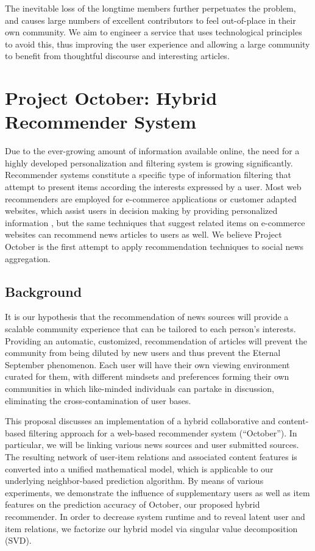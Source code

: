 \documentclass[11pt,letterpaper]{article}
\begin{document}
The inevitable loss of the longtime members further perpetuates the problem, and causes large numbers of excellent contributors to feel out-of-place in their own community.
We aim to engineer a service that uses technological principles to avoid this, thus improving the user experience and allowing a large community to benefit from thoughtful discourse and interesting articles. \\

\newpage


\section{Project October: Hybrid Recommender System}

Due to the ever-growing amount of information available online, the need for a highly developed personalization and filtering system is growing significantly.
Recommender systems constitute a specific type of information filtering that
attempt to present items according the interests expressed by a user\cite{adom}.
Most web recommenders are employed for e-commerce applications or customer
adapted websites, which assist users in decision making by providing
personalized information \cite{linden}, but the same techniques that
suggest related items on e-commerce websites can recommend news articles to users as well.
We believe Project October is the first attempt to apply recommendation techniques to social news aggregation.

\subsection{Background}
It is our hypothesis that the recommendation of news sources will provide a scalable community experience that can be tailored to each person's interests.
Providing an automatic, customized, recommendation of articles will prevent the community from being diluted by new users and thus prevent the Eternal September phenomenon.
Each user will have their own viewing environment curated for them, with different mindsets and preferences forming their own communities in which like-minded individuals can partake in discussion, eliminating the cross-contamination of user bases.  

This proposal discusses an implementation of a hybrid collaborative and content-based filtering approach for a web-based recommender system (``October'').
In particular, we will be linking various news sources and user submitted sources.
The resulting network of user-item relations and associated content features is converted into a unified mathematical model, which is applicable to our underlying neighbor-based prediction algorithm.
By means of various experiments, we demonstrate the influence of supplementary users as well as item features on the prediction accuracy of October, our proposed hybrid recommender. In order to decrease system runtime and to reveal latent user and item relations, we factorize our hybrid model via singular value decomposition (SVD).
\end{document}

